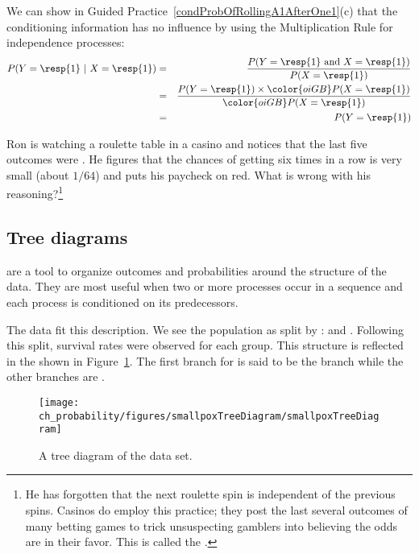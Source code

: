 \textC{\newpage}

We can show in Guided Practice~\ref{condProbOfRollingA1AfterOne1}(c) that the conditioning information has no influence by using the Multiplication Rule for independence processes:
\begin{eqnarray*}
P(Y=\text{\resp{1}}\ |\ X=\text{\resp{1}})
	&=& \frac{P(Y=\text{\resp{1} and }X=\text{\resp{1}})}{P(X=\text{\resp{1}})} \\
	&=& \frac{P(Y=\text{\resp{1}})\times \color{oiGB}P(X=\text{\resp{1}})}{\color{oiGB}P(X=\text{\resp{1}})} \\
	&=& P(Y=\text{\resp{1}}) \\
\end{eqnarray*}

\begin{exercise}
Ron is watching a roulette table in a casino and notices that the last five outcomes were . He figures that the chances of getting  six times in a row is very small (about $1/64$) and puts his paycheck on red. What is wrong with his reasoning?\footnote{He has forgotten that the next roulette spin is independent of the previous spins. Casinos do employ this practice; they post the last several outcomes of many betting games to trick unsuspecting gamblers into believing the odds are in their favor. This is called the .}
\end{exercise}


\subsection{Tree diagrams}


 are a tool to organize outcomes and probabilities around the structure of the data. They are most useful when two or more processes occur in a sequence and each process is conditioned on its predecessors.

The  data fit this description. We see the population as split by :  and . Following this split, survival rates were observed for each group. This structure is reflected in the  shown in Figure~\ref{smallpoxTreeDiagram}. The first branch for  is said to be the  branch while the other branches are .

\begin{figure}[ht]
\centering
\texttt{[image: ch\_probability/figures/smallpoxTreeDiagram/smallpoxTreeDiagram]}
\caption{A tree diagram of the  data set.}
\label{smallpoxTreeDiagram}
\end{figure}

